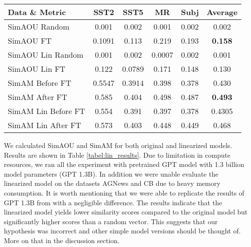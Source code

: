 \begin{table*}[t]
    \centering
    \caption{SimAOU and SimAM on four datasets, comparing similarity between random and finetune for both original model and liniarization of the model.}
    \label{tabel:lin_results}
    \begin{tabular}{|l|cccc|c|}
    \hline
    Data \& Metric & SST2 & SST5 & MR & Subj & Average \\ \hline
    SimAOU Random & 0.001 & 0.002 & 0.001 & 0.002 & 0.002\\ 
    SimAOU FT & 0.1091 & 0.113& 0.219& 0.193 & \textbf{0.158} \\ 
    SimAOU Lin Random & 0.001 & 0.002 & 0.0007 & 0.002	& 0.001 \\
    SimAOU Lin FT & 0.122 & 0.0789 &	0.171	& 0.148	& 0.130 \\ \hline
    SimAM Before FT & 0.5547 & 0.3914 & 0.398 & 0.378 & 0.430 \\
    SimAM After FT & 0.585 & 0.404 & 0.498 & 0.487 & \textbf{0.493} \\
    SimAM Lin Before FT & 0.554 & 0.391 &	0.397 & 0.378 & 0.4305 \\
    SimAM Lin After FT & 0.573 & 0.403 & 0.448 & 0.449 & 0.468 \\ \hline
    \end{tabular}
    \end{table*}

We calculated SimAOU and SimAM for both original and linearized models. Results are shown in Table \ref{tabel:lin_results}.
Due to limitation in compute resources, we ran all the experiment with pretrained GPT model with 1.3 billion model parameters (GPT 1.3B). In addition we were unable evaluate the linearized model on the datasets AGNews and CB due to heavy memory consumption. It is worth mentioning that we were able to replicate the results of GPT 1.3B from \cite{dai2023gpt} with a negligible difference. 
The results indicate that the linearized model yields lower similarity scores compared to the original model but significantly higher scores than a random vector. This suggests that our hypothesis was incorrect and other simple model versions should be thought of. More on that in the discussion section.
    